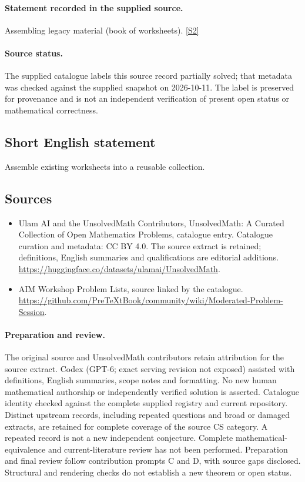 \documentclass[11pt]{article}
\begin{document}
\paragraph{Statement recorded in the supplied source.}
Assembling legacy material (book of worksheets). \href{https://github.com/PreTeXtBook/community/wiki/Moderated-Problem-Session}{[S2]}
\paragraph{Source status.}
The supplied catalogue labels this source record partially solved; that metadata was checked against the supplied snapshot on 2026-10-11. The label is preserved for provenance and is not an independent verification of present open status or mathematical correctness.
\subsection{Short English statement}
Assemble existing worksheets into a reusable collection.
\subsection{Sources}
\begin{itemize}
\item[S1] Ulam AI and the UnsolvedMath Contributors, UnsolvedMath: A Curated Collection of Open Mathematics Problems, catalogue entry. Catalogue curation and metadata: CC BY 4.0. The source extract is retained; definitions, English summaries and qualifications are editorial additions.
\url{https://huggingface.co/datasets/ulamai/UnsolvedMath}.
\item[S2] AIM Workshop Problem Lists, source linked by the catalogue.
\url{https://github.com/PreTeXtBook/community/wiki/Moderated-Problem-Session}.
\end{itemize}
\paragraph{Preparation and review.}
The original source and UnsolvedMath contributors retain attribution for the source extract. Codex (GPT-6; exact serving revision not exposed) assisted with definitions, English summaries, scope notes and formatting. No new human mathematical authorship or independently verified solution is asserted. Catalogue identity checked against the complete supplied registry and current repository. Distinct upstream records, including repeated questions and broad or damaged extracts, are retained for complete coverage of the source CS category. A repeated record is not a new independent conjecture. Complete mathematical-equivalence and current-literature review has not been performed. Preparation and final review follow contribution prompts C and D, with source gaps disclosed. Structural and rendering checks do not establish a new theorem or open status.
\label{end:statement}
\end{document}
